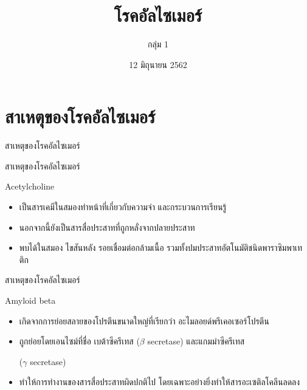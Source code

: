 \documentclass[xetex,serif]{beamer}
\title{โรคอัลไซเมอร์}
\author{กลุ่ม 1}
\date{12 มิถุนายน 2562}
\institute{ห้อง 39}
\begin{document}
\begin{frame}
  \maketitle
\end{frame}

\section{สาเหตุของโรคอัลไซเมอร์}

\begin{frame}{สาเหตุของโรคอัลไซเมอร์}

\begin{center}
\end{center}

\end{frame}

\begin{frame}{สาเหตุของโรคอัลไซเมอร์}

  {\large Acetylcholine}
  \begin{itemize}
    \item เป็นสารเคมีในสมองทำหน้าที่เกี่ยวกับความจำ และกระบวนการเรียนรู้
    \item นอกจากนี้ยังเป็นสารสื่อประสาทที่ถูกหลั่งจากปลายประสาท
    \item พบได้ในสมอง ไขสันหลัง รอยเชื่อมต่อกล้ามเนื้อ รวมทั้งปมประสาทอัตโนมัติชนิดพาราซิมพาเทติก
  \end{itemize}
\end{frame}

\begin{frame}{สาเหตุของโรคอัลไซเมอร์}

  {\large Amyloid beta}

  \begin{itemize}
    \item เกิดจากการย่อยสลายของโปรตีนขนาดใหญ่ที่เรียกว่า อะไมลอยด์พรีเคอเซอร์โปรตีน
    \item ถูกย่อยโดยเอนไซม์ที่ชื่อ เบต้าซีครีเทส ($\beta$ secretase) และแกมม่าซีครีเทส
    
    ($\gamma$ secretase)
    \item ทำให้การทำงานของสารสื่อประสาทผิดปกติไป โดยเฉพาะอย่างยิ่งทำให้สารอะเซติลโคลีนลดลง  
  \end{itemize}
\end{frame}
\end{document}
